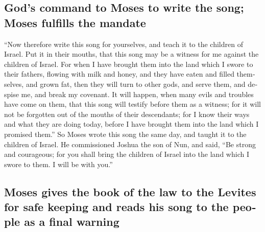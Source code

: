 \begin{paracol}{2}
\begin{otherlanguage}{english}
\hypertarget{gods-command-to-moses-to-write-the-song-moses-fulfills-the-mandate}{%
\subsection{God's command to Moses to write the song; Moses fulfills the
mandate}\label{gods-command-to-moses-to-write-the-song-moses-fulfills-the-mandate}}

 ``Now therefore write this song for yourselves, and
teach it to the children of Israel. Put it in their mouths, that this
song may be a witness for me against the children of Israel.
 For when I have brought them into the land which I swore
to their fathers, flowing with milk and honey, and they have eaten and
filled themselves, and grown fat, then they will turn to other gods, and
serve them, and despise me, and break my covenant.  It
will happen, when many evils and troubles have come on them, that this
song will testify before them as a witness; for it will not be forgotten
out of the mouths of their descendants; for I know their ways and what
they are doing today, before I have brought them into the land which I
promised them.''  So Moses wrote this song the same day,
and taught it to the children of Israel.  He commissioned
Joshua the son of Nun, and said, ``Be strong and courageous; for you
shall bring the children of Israel into the land which I swore to them.
I will be with you.''

\hypertarget{moses-gives-the-book-of-the-law-to-the-levites-for-safe-keeping-and-reads-his-song-to-the-people-as-a-final-warning}{%
\subsection{Moses gives the book of the law to the Levites for safe
keeping and reads his song to the people as a final
warning}\label{moses-gives-the-book-of-the-law-to-the-levites-for-safe-keeping-and-reads-his-song-to-the-people-as-a-final-warning}}


\end{otherlanguage}
\end{paracol}
